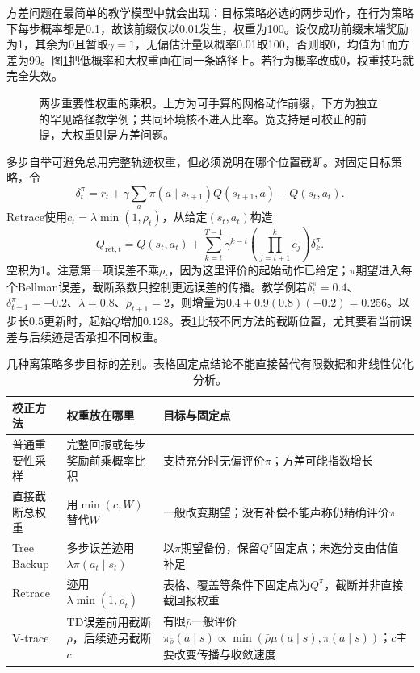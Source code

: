 方差问题在最简单的教学模型中就会出现：目标策略必选的两步动作，在行为策略下每步概率都是0.1，故该前缀仅以0.01发生，权重为100。设仅成功前缀末端奖励为1，其余为0且暂取$\gamma=1$，无偏估计量以概率0.01取100，否则取0，均值为1而方差为99。图\ref{fig:rl-learning-is-sampling}把低概率和大权重画在同一条路径上。若行为概率改成0，权重技巧就完全失效。

\begin{figure}[htbp]
  \centering
  
  \caption{两步重要性权重的乘积。上方为可手算的网格动作前缀，下方为独立的罕见路径教学例；共同环境核不进入比率。宽支持是可校正的前提，大权重则是方差问题。}
  \label{fig:rl-learning-is-sampling}
\end{figure}

多步自举可避免总用完整轨迹权重，但必须说明在哪个位置截断。对固定目标策略，令
\[
  \delta_t^\pi=r_t+\gamma\sum_a\pi(a\mid s_{t+1})Q(s_{t+1},a)
                       -Q(s_t,a_t).
\]
Retrace使用$c_t=\lambda\min(1,\rho_t)$，从给定$(s_t,a_t)$构造
\begin{equation}
  Q_{\mathrm{ret},t}
   =Q(s_t,a_t)+\sum_{k=t}^{T-1}
        \gamma^{k-t}\left(\prod_{j=t+1}^{k}c_j\right)\delta_k^\pi .
  \label{eq:rl-learning-retrace}
\end{equation}
空积为1。注意第一项误差不乘$\rho_t$，因为这里评价的起始动作已给定；$\pi$期望进入每个Bellman误差，截断系数只控制更远误差的传播。教学例若$\delta_t^\pi=0.4$、$\delta_{t+1}^\pi=-0.2$、$\lambda=0.8$、$\rho_{t+1}=2$，则增量为$0.4+0.9(0.8)(-0.2)=0.256$。以步长$0.5$更新时，起始$Q$增加$0.128$。表\ref{tab:rl-learning-off-policy-targets}比较不同方法的截断位置，尤其要看当前误差与后续迹是否承担不同权重。

\begin{table}[t]
  \centering
  \small
  \begin{tabularx}{\linewidth}{>{\raggedright\arraybackslash}p{23mm} >{\raggedright\arraybackslash}X >{\raggedright\arraybackslash}X}
    \toprule
    校正方法 & 权重放在哪里 & 目标与固定点 \\
    \midrule
    普通重要性采样 & 完整回报或每步奖励前乘概率比积 & 支持充分时无偏评价$\pi$；方差可能指数增长 \\
    直接截断总权重 & 用$\min(c,W)$替代$W$ & 一般改变期望；没有补偿不能声称仍精确评价$\pi$ \\
    Tree Backup & 多步误差迹用$\lambda\pi(a_t\mid s_t)$ & 以$\pi$期望备份，保留$Q^\pi$固定点；未选分支由估值补足 \\
    Retrace & 迹用$\lambda\min(1,\rho_t)$ & 表格、覆盖等条件下固定点为$Q^\pi$，截断并非直接截回报权重 \\
    V-trace & TD误差前用截断$\rho$，后续迹另截断$c$ & 有限$\bar\rho$一般评价$\pi_{\bar\rho}(a\mid s)\propto\min(\bar\rho\mu(a\mid s),\pi(a\mid s))$；$c$主要改变传播与收敛速度 \\
    \bottomrule
  \end{tabularx}
  \caption{几种离策略多步目标的差别。表格固定点结论不能直接替代有限数据和非线性优化分析。}
  \label{tab:rl-learning-off-policy-targets}
\end{table}

